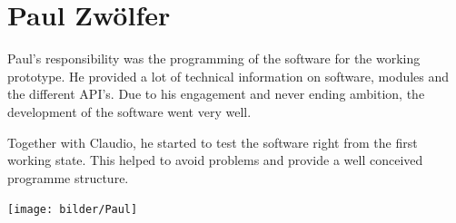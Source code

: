 \section*{Paul Zwölfer}
Paul's responsibility was the programming of the software for the working prototype. He provided a lot of technical information on software, modules and the different API's. Due to his engagement and never ending ambition, the development of the software went very well.

Together with Claudio, he started to test the software right from the first working state. This helped to avoid problems and provide a well conceived programme structure.
\begin{center}
\texttt{[image: bilder/Paul]}
\end{center}